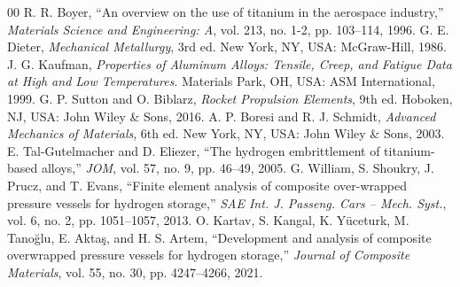 \documentclass[conference]{IEEEtran}
\begin{document}
\begin{thebibliography}{00}
 R. R. Boyer, ``An overview on the use of titanium in the aerospace industry,'' \textit{Materials Science and Engineering: A}, vol. 213, no. 1-2, pp. 103--114, 1996.
 G. E. Dieter, \textit{Mechanical Metallurgy}, 3rd ed. New York, NY, USA: McGraw-Hill, 1986.
 J. G. Kaufman, \textit{Properties of Aluminum Alloys: Tensile, Creep, and Fatigue Data at High and Low Temperatures}. Materials Park, OH, USA: ASM International, 1999.
 G. P. Sutton and O. Biblarz, \textit{Rocket Propulsion Elements}, 9th ed. Hoboken, NJ, USA: John Wiley \& Sons, 2016.
 A. P. Boresi and R. J. Schmidt, \textit{Advanced Mechanics of Materials}, 6th ed. New York, NY, USA: John Wiley \& Sons, 2003.
 E. Tal-Gutelmacher and D. Eliezer, ``The hydrogen embrittlement of titanium-based alloys,'' \textit{JOM}, vol. 57, no. 9, pp. 46--49, 2005.
 G. William, S. Shoukry, J. Prucz, and T. Evans, ``Finite element analysis of composite over-wrapped pressure vessels for hydrogen storage,'' \textit{SAE Int. J. Passeng. Cars -- Mech. Syst.}, vol. 6, no. 2, pp. 1051--1057, 2013.
 O. Kartav, S. Kangal, K. Y\"uceturk, M. Tano\u{g}lu, E. Akta\c{s}, and H. S. Artem, ``Development and analysis of composite overwrapped pressure vessels for hydrogen storage,'' \textit{Journal of Composite Materials}, vol. 55, no. 30, pp. 4247--4266, 2021.
\end{thebibliography}
\end{document}
